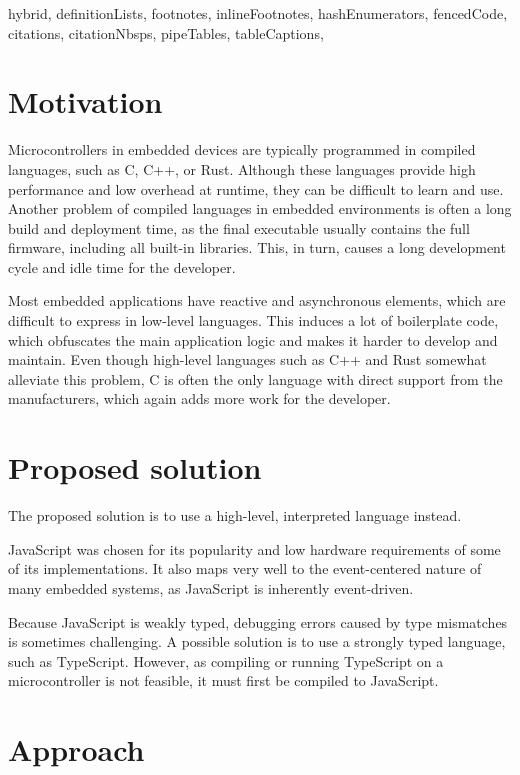 \documentclass[
  digital,
  oneside,
  nosansbold,
  nocolorbold,
  lof,
  lot
]{fithesis4}
\begin{document}
\begin{markdown*}{%
  hybrid,
  definitionLists,
  footnotes,
  inlineFootnotes,
  hashEnumerators,
  fencedCode,
  citations,
  citationNbsps,
  pipeTables,
  tableCaptions,
}

\chapter{Motivation}

Microcontrollers in embedded devices are typically programmed in compiled languages, such as C, C++, or Rust. Although these languages provide high performance and low overhead at runtime, they can be difficult to learn and use. Another problem of compiled languages in embedded environments is often a long build and deployment time, as the final executable usually contains the full firmware, including all built-in libraries. This, in turn, causes a long development cycle and idle time for the developer.

Most embedded applications have reactive and asynchronous elements, which are difficult to express in low-level languages. This induces a lot of boilerplate code, which obfuscates the main application logic and makes it harder to develop and maintain. Even though high-level languages such as C++ and Rust somewhat alleviate this problem, C is often the only language with direct support from the manufacturers, which again adds more work for the developer.

\chapter{Proposed solution}

The proposed solution is to use a high-level, interpreted language instead.

JavaScript was chosen for its popularity and low hardware requirements of some of its implementations. It also maps very well to the event-centered nature of many embedded systems, as JavaScript is inherently event-driven.

Because JavaScript is weakly typed, debugging errors caused by type mismatches is sometimes challenging. A possible solution is to use a strongly typed language, such as TypeScript. However, as compiling or running TypeScript on a microcontroller is not feasible, it must first be compiled to JavaScript.

\chapter{Approach}


\end{markdown*}
\end{document}
